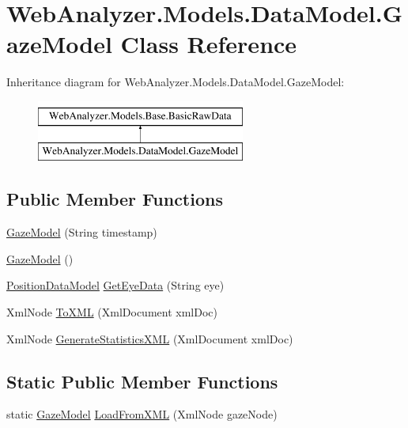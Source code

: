 \hypertarget{class_web_analyzer_1_1_models_1_1_data_model_1_1_gaze_model}{}\section{Web\+Analyzer.\+Models.\+Data\+Model.\+Gaze\+Model Class Reference}
\label{class_web_analyzer_1_1_models_1_1_data_model_1_1_gaze_model}
Inheritance diagram for Web\+Analyzer.\+Models.\+Data\+Model.\+Gaze\+Model\+:\begin{figure}[H]
\begin{center}
\leavevmode
\includegraphics[height=2.000000cm]{class_web_analyzer_1_1_models_1_1_data_model_1_1_gaze_model}
\end{center}
\end{figure}
\subsection*{Public Member Functions}
\begin{DoxyCompactItemize}
\item 
\hyperlink{class_web_analyzer_1_1_models_1_1_data_model_1_1_gaze_model_a66f9cf33a64b7fc07aba8203be3a481c}{Gaze\+Model} (String timestamp)
\item 
\hyperlink{class_web_analyzer_1_1_models_1_1_data_model_1_1_gaze_model_a711f713288d82f87ee51b760d93e8cd6}{Gaze\+Model} ()
\item 
\hyperlink{class_web_analyzer_1_1_models_1_1_data_model_1_1_position_data_model}{Position\+Data\+Model} \hyperlink{class_web_analyzer_1_1_models_1_1_data_model_1_1_gaze_model_a0bde3b1a59828e2bc8680917872a89b1}{Get\+Eye\+Data} (String eye)
\item 
Xml\+Node \hyperlink{class_web_analyzer_1_1_models_1_1_data_model_1_1_gaze_model_a0b04be81bba52c2b204aade39f0e945b}{To\+X\+M\+L} (Xml\+Document xml\+Doc)
\item 
Xml\+Node \hyperlink{class_web_analyzer_1_1_models_1_1_data_model_1_1_gaze_model_a376ad99abf5742a4086e891a755a551c}{Generate\+Statistics\+X\+M\+L} (Xml\+Document xml\+Doc)
\end{DoxyCompactItemize}
\subsection*{Static Public Member Functions}
\begin{DoxyCompactItemize}
\item 
static \hyperlink{class_web_analyzer_1_1_models_1_1_data_model_1_1_gaze_model}{Gaze\+Model} \hyperlink{class_web_analyzer_1_1_models_1_1_data_model_1_1_gaze_model_af6ae5c749db932c888009e906ea457d5}{Load\+From\+X\+M\+L} (Xml\+Node gaze\+Node)
\end{DoxyCompactItemize}
